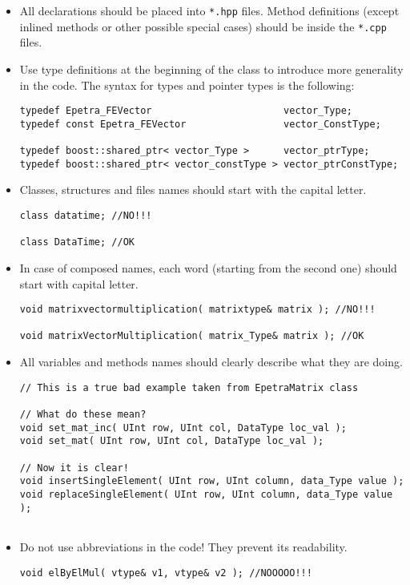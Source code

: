 \documentclass[a4paper]{article}
\begin{document}
\begin{itemize}
  \item All declarations should be placed into \texttt{*.hpp} files. Method
  definitions (except inlined methods or other possible special cases)
  should be inside the \texttt{*.cpp} files.
  \item Use type definitions at the beginning of the class to introduce more
  generality in the code. The syntax for types and pointer types is
  the following:
\begin{lstlisting}
typedef Epetra_FEVector                       vector_Type;
typedef const Epetra_FEVector                 vector_ConstType;

typedef boost::shared_ptr< vector_Type >      vector_ptrType;
typedef boost::shared_ptr< vector_constType > vector_ptrConstType;
\end{lstlisting}
  \item Classes, structures and files names should start with the capital
  letter.
\begin{lstlisting}
class datatime; //NO!!!
  
class DataTime; //OK
\end{lstlisting}
  \item In case of composed names, each word (starting from the second one)
  should start with capital letter.
\begin{lstlisting}
void matrixvectormultiplication( matrixtype& matrix ); //NO!!!
  
void matrixVectorMultiplication( matrix_Type& matrix ); //OK
\end{lstlisting}
  \item All variables and methods names should clearly describe what they are
  doing.
\begin{lstlisting}
// This is a true bad example taken from EpetraMatrix class
  
// What do these mean?
void set_mat_inc( UInt row, UInt col, DataType loc_val );
void set_mat( UInt row, UInt col, DataType loc_val );
  
// Now it is clear!
void insertSingleElement( UInt row, UInt column, data_Type value );
void replaceSingleElement( UInt row, UInt column, data_Type value );
  
  \end{lstlisting}
  \item Do not use abbreviations in the code! They prevent its readability.
\begin{lstlisting}
void elByElMul( vtype& v1, vtype& v2 ); //NOOOOO!!!
  

\end{lstlisting}
\end{itemize}
\end{document}

